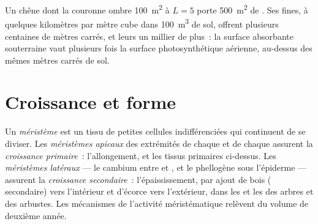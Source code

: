 \begin{example}\label{ex:b1:flowering-plant-organization:oaksurfaces}
Un chêne dont la couronne ombre \qty{100}{m^2} à $L = 5$ porte
\qty{500}{m^2} de . Ses  fines, à quelques kilomètres par
mètre cube dans \qty{100}{m^3} de sol, offrent plusieurs centaines de
mètres carrés, et leurs  un millier de plus~: la surface
absorbante souterraine vaut plusieurs fois la surface photosynthétique
aérienne, au-dessus des mêmes mètres carrés de sol.
\end{example}

\section{Croissance et forme}

\begin{definition}\label{def:b1:flowering-plant-organization:meristem}
Un \emph{méristème} est un tissu de petites cellules
indifférenciées qui continuent de se diviser. Les \emph{méristèmes
apicaux} des extrémités de chaque  et de
chaque  assurent la \emph{croissance
primaire}~: l'allongement, et les tissus
primaires ci-dessus. Les \emph{méristèmes
latéraux} --- le cambium entre  et
, et le phellogène sous l'épiderme --- assurent la
\emph{croissance secondaire}~:
l'épaississement, par ajout de bois ( secondaire) vers l'intérieur
et d'écorce vers l'extérieur, dans les  et les  des arbres
et des arbustes. Les mécanismes de l'activité méristématique relèvent du
volume de deuxième année.
\end{definition}

